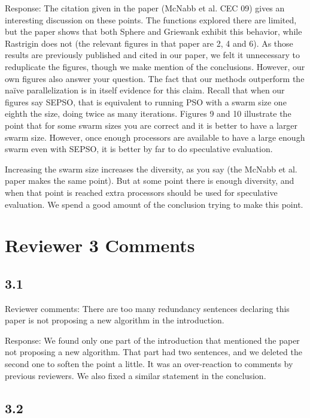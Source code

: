 \documentclass[onecolumn, 12pt]{article}
\begin{document}
Response: The citation given in the paper (McNabb et al. CEC 09) gives an
interesting discussion on these points.  The functions explored there are
limited, but the paper shows that both Sphere and Griewank exhibit this
behavior, while Rastrigin does not (the relevant figures in that paper are 2, 4
and 6).  As those results are previously published and cited in our paper, we
felt it unnecessary to reduplicate the figures, though we make mention of the
conclusions.  However, our own figures also answer your question.  The fact
that our methods outperform the na\"ive parallelization is in itself evidence
for this claim.  Recall that when our figures say SEPSO, that is equivalent to
running PSO with a swarm size one eighth the size, doing twice as many
iterations.  Figures 9 and 10 illustrate the point that for some swarm sizes
you are correct and it is better to have a larger swarm size.  However, once
enough processors are available to have a large enough swarm even with SEPSO,
it is better by far to do speculative evaluation.

Increasing the swarm size increases the diversity, as you say (the McNabb et
al. paper makes the same point).  But at some point there is enough diversity,
and when that point is reached extra processors should be used for speculative
evaluation.  We spend a good amount of the conclusion trying to make this
point.

\section*{Reviewer 3 Comments}

\subsection*{3.1}

Reviewer comments: There are too many redundancy sentences declaring this paper
is not proposing a new algorithm in the introduction.

Response: We found only one part of the introduction that mentioned the paper
not proposing a new algorithm.  That part had two sentences, and we deleted the
second one to soften the point a little.  It was an over-reaction to comments
by previous reviewers.  We also fixed a similar statement in the conclusion.

\subsection*{3.2}
\end{document}
